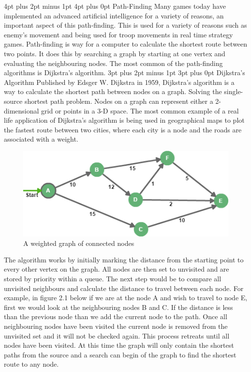 \documentclass[12pt,a4paper,oneside]{book}
\makeatletter
\renewcommand\subsection{\@startsection {subsection}{1}{2mm} %
                               {3pt plus 2pt minus 1pt} %
                               {3pt plus 0pt} %
                               {\normalfont\bfseries}}
\renewcommand\section{\@startsection {section}{1}{0mm} %
                               {4pt plus 2pt minus 1pt} %
                               {4pt plus 0pt} %
                               {\bfseries}}
\makeatother
\begin{document}
\section{Path-Finding}
Many games today have implemented an advanced artificial intelligence for a variety of reasons, an important aspect of this path-finding. This is used for a variety of reasons such as enemy’s movement and being used for troop movements in real time strategy games. Path-finding is way for a computer to calculate the shortest route between two points. It does this by searching a graph by starting at one vertex and evaluating the neighbouring nodes. The most common of the path-finding algorithms is Dijkstra's algorithm.	
\subsection{Dijkstra’s Algorithm}
Published by Edsger W. Dijkstra in 1959, Dijkstra’s algorithm is a way to calculate the shortest path between nodes on a graph. Solving the single-source shortest path problem. Nodes on a graph can represent either a 2-dimensional grid or points in a 3-D space. The most common example of a real life application of Dijkstra’s algorithm is being used in geographical maps to plot the fastest route between two cities, where each city is a node and the roads are associated with a weight. 
\vspace{2mm} 
\newline
\begin{figure}[H]
	\includegraphics[width=\linewidth]{images/Dijsk.png}
	\caption{A weighted graph of connected nodes}
\end{figure}
The algorithm works by initially marking the distance from the starting point to every other vertex on the graph. All nodes are then set to unvisited and are stored  by priority within a queue. The next step would be to compare all unvisited neighbours and calculate the distance to travel between each node. For example, in figure 2.1 below if we are at the node A and wish to travel to node E, first we would look at the neighbouring nodes B and C. If the distance is less than the previous node than we add the current node to the path. Once all neighbouring nodes have been visited the current node is removed from the unvisited set and it will not be checked again. This process retreats until all nodes have been visited. At this time the graph will only contain the shortest paths from the source and a search can begin of the graph to find the shortest route to any node.
\end{document}
